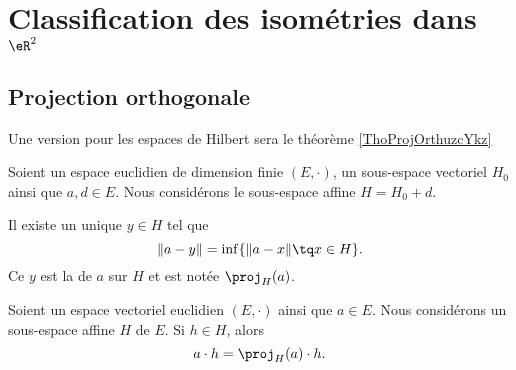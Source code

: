 
\section{Classification des isométries dans \( \eR^2\)}

\subsection{Projection orthogonale}

Une version pour les espaces de Hilbert sera le théorème \ref{ThoProjOrthuzcYkz}
\begin{propositionDef}      \label{DEFooHXJTooNPyDFQ}
	Soient un espace euclidien de dimension finie \( (E,\cdot)\), un sous-espace vectoriel \( H_0\) ainsi que \( a,d\in E\). Nous considérons le sous-espace affine \( H=H_0+d\).

	Il existe un unique \( y\in H\) tel que
	\begin{equation}
		\| a-y  \|=\inf\{ \| a-x \|\tq x\in H \}.
	\end{equation}
	Ce \( y\) est la  de \( a\) sur \( H\) et est notée \( \proj_H(a)\).
\end{propositionDef}

\begin{lemma}       \label{LEMooXZMFooOPTjNx}
	Soient un espace vectoriel euclidien \( (E,\cdot)\) ainsi que \( a\in E\). Nous considérons un sous-espace affine \( H\) de \( E\). Si \(h\in H\), alors
	\begin{equation}
		a\cdot h=\proj_H(a)\cdot h.
	\end{equation}
\end{lemma}

